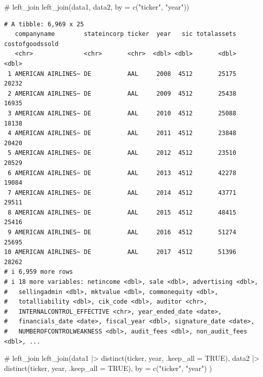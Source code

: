 \documentclass[
  letterpaper,
  DIV=11,
  numbers=noendperiod]{scrreprt}
\newenvironment{Shaded}{\begin{snugshade}}{\end{snugshade}}
\newcommand{\AttributeTok}[1]{\textcolor[rgb]{0.40,0.45,0.13}{#1}}
\newcommand{\CommentTok}[1]{\textcolor[rgb]{0.37,0.37,0.37}{#1}}
\newcommand{\ConstantTok}[1]{\textcolor[rgb]{0.56,0.35,0.01}{#1}}
\newcommand{\FunctionTok}[1]{\textcolor[rgb]{0.28,0.35,0.67}{#1}}
\newcommand{\NormalTok}[1]{\textcolor[rgb]{0.00,0.23,0.31}{#1}}
\newcommand{\SpecialCharTok}[1]{\textcolor[rgb]{0.37,0.37,0.37}{#1}}
\newcommand{\StringTok}[1]{\textcolor[rgb]{0.13,0.47,0.30}{#1}}
\begin{document}
\begin{Shaded}
\begin{Highlighting}[]
\CommentTok{\# left\_join}
\FunctionTok{left\_join}\NormalTok{(data1, data2, }\AttributeTok{by =} \FunctionTok{c}\NormalTok{(}\StringTok{"ticker"}\NormalTok{, }\StringTok{"year"}\NormalTok{))}
\end{Highlighting}
\end{Shaded}

\begin{verbatim}
# A tibble: 6,969 x 25
   companyname        stateincorp ticker  year   sic totalassets costofgoodssold
   <chr>              <chr>       <chr>  <dbl> <dbl>       <dbl>           <dbl>
 1 AMERICAN AIRLINES~ DE          AAL     2008  4512       25175           20232
 2 AMERICAN AIRLINES~ DE          AAL     2009  4512       25438           16935
 3 AMERICAN AIRLINES~ DE          AAL     2010  4512       25088           18138
 4 AMERICAN AIRLINES~ DE          AAL     2011  4512       23848           20420
 5 AMERICAN AIRLINES~ DE          AAL     2012  4512       23510           20529
 6 AMERICAN AIRLINES~ DE          AAL     2013  4512       42278           19084
 7 AMERICAN AIRLINES~ DE          AAL     2014  4512       43771           29511
 8 AMERICAN AIRLINES~ DE          AAL     2015  4512       48415           25416
 9 AMERICAN AIRLINES~ DE          AAL     2016  4512       51274           25695
10 AMERICAN AIRLINES~ DE          AAL     2017  4512       51396           28262
# i 6,959 more rows
# i 18 more variables: netincome <dbl>, sale <dbl>, advertising <dbl>,
#   sellingadmin <dbl>, mktvalue <dbl>, commonequity <dbl>,
#   totalliability <dbl>, cik_code <dbl>, auditor <chr>,
#   INTERNALCONTROL_EFFECTIVE <chr>, year_ended_date <date>,
#   financials_date <date>, fiscal_year <dbl>, signature_date <date>,
#   NUMBEROFCONTROLWEAKNESS <dbl>, audit_fees <dbl>, non_audit_fees <dbl>, ...
\end{verbatim}

\begin{Shaded}
\begin{Highlighting}[]
\CommentTok{\# left\_join}
\FunctionTok{left\_join}\NormalTok{(data1 }\SpecialCharTok{|\textgreater{}} \FunctionTok{distinct}\NormalTok{(ticker, year, }\AttributeTok{.keep\_all =} \ConstantTok{TRUE}\NormalTok{), }
\NormalTok{          data2 }\SpecialCharTok{|\textgreater{}} \FunctionTok{distinct}\NormalTok{(ticker, year, }\AttributeTok{.keep\_all =} \ConstantTok{TRUE}\NormalTok{), }
          \AttributeTok{by =} \FunctionTok{c}\NormalTok{(}\StringTok{"ticker"}\NormalTok{, }\StringTok{"year"}\NormalTok{)}
\NormalTok{          )}
\end{Highlighting}
\end{Shaded}
\end{document}
